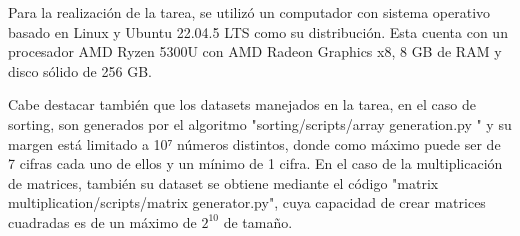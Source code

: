 Para la realización de la tarea, se utilizó un computador con sistema operativo basado en Linux y Ubuntu 22.04.5 LTS como su distribución. Esta cuenta con un procesador AMD Ryzen 5300U con AMD Radeon Graphics x8, 8 GB de RAM y disco sólido de 256 GB.

Cabe destacar también que los datasets manejados en la tarea, en el caso de sorting, son generados por el algoritmo "sorting/scripts/array generation.py " y su margen está limitado a 10⁷ números distintos, donde como máximo puede ser de 7 cifras cada uno de ellos y un mínimo de 1 cifra. En el caso de la multiplicación de matrices, también su dataset se obtiene mediante el código "matrix multiplication/scripts/matrix generator.py", cuya capacidad de crear matrices cuadradas es de un máximo de $2^{10}$ de tamaño.

